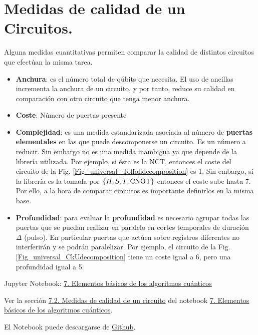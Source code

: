 \documentclass[a4paper,11pt]{book} %
\numberwithin{equation}{chapter}
\begin{document}
    \section{Medidas de calidad de un Circuitos.}

Alguna medidas cuantitativas  permiten comparar la calidad de distintos circuitos que efectúan la misma tarea. 
\begin{itemize}
	\item \textbf{Anchura}: es el número total de qúbits  que necesita. El uso de ancillas incrementa la anchura de un circuito, y por tanto, reduce su calidad en comparación con otro circuito que tenga menor anchura. 
	
	\item \textbf{Coste}: Número de puertas presente
	
	\item \textbf{Complejidad}: es una medida estandarizada asociada al número de \textbf{puertas elementales} en las que puede descomponerse un circuito.  Es un número a reducir. Sin embargo no es una medida inambigua ya que depende de la librería utilizada. Por ejemplo, si ésta es la NCT, entonces el coste del circuito de la Fig. \ref{Fig_universal_Toffolidecomposition} es 1. Sin embargo, si la librería es la tomada por $ \{ H, S, T, \hbox{CNOT}\}$ entonces el coste sube hasta 7. Por ello, a la hora de comparar circuitos es importante definirlos en la misma base. 
	
	\item \textbf{Profundidad}: para evaluar la \textbf{profundidad} es necesario agrupar todas las puertas que se puedan realizar en paralelo en cortes temporales de duración $\Delta$ (pulso). En particular puertas que actúen sobre registros diferentes no interferirán y se podrán paralelizar. Por ejemplo, el circuito de la Fig. \ref{Fig_universal_CkUdecomposition} tiene un coste igual a 6, pero una profundidad igual a 5. 
\end{itemize}

	\begin{mybox_orange}{Jupyter Notebook: \href{https://www.scbi.uma.es/web/wp-content/uploads/Jupyterbook/CICC_UMA/Notebooks/html/docs/Part_01/Chapter_07-Elementos_Basicos_myst.html}{7. Elementos básicos de los algoritmos cuánticos}}
	
	Ver la sección \href{https://www.scbi.uma.es/web/wp-content/uploads/Jupyterbook/CICC_UMA/Notebooks/html/docs/Part_01/Chapter_07-Elementos_Basicos_myst.html#medidas-de-calidad-de-un-circuito}{7.2. Medidas de calidad de un circuito} del notebook \href{https://www.scbi.uma.es/web/wp-content/uploads/Jupyterbook/CICC_UMA/Notebooks/html/docs/Part_01/Chapter_07-Elementos_Basicos_myst.html}{7. Elementos básicos de los algoritmos cuánticos}.

	El Notebook puede descargarse de \href{https://github.com/davidcb98/CICC_UMA/blob/master/Notebooks/Part_01/Chapter_07-Elementos_Basicos.ipynb}{Github}.
	
	\end{mybox_orange}
	
\end{document}
